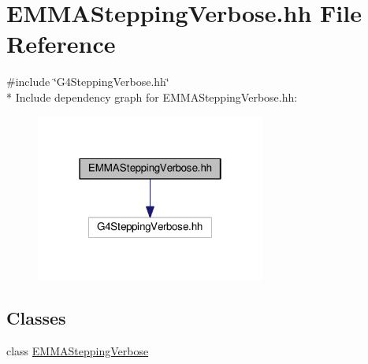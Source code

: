 \hypertarget{EMMASteppingVerbose_8hh}{}\section{E\+M\+M\+A\+Stepping\+Verbose.\+hh File Reference}
\label{EMMASteppingVerbose_8hh}
{\ttfamily \#include \char`\"{}G4\+Stepping\+Verbose.\+hh\char`\"{}}\\*
Include dependency graph for E\+M\+M\+A\+Stepping\+Verbose.\+hh\+:
\nopagebreak
\begin{figure}[H]
\begin{center}
\leavevmode
\includegraphics[width=214pt]{EMMASteppingVerbose_8hh__incl}
\end{center}
\end{figure}
\subsection*{Classes}
\begin{DoxyCompactItemize}
\item 
class \hyperlink{classEMMASteppingVerbose}{E\+M\+M\+A\+Stepping\+Verbose}
\end{DoxyCompactItemize}
